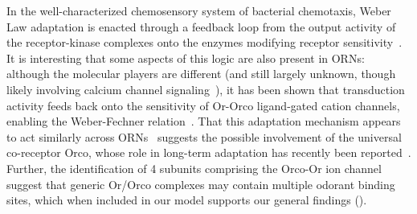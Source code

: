 \documentclass[9pt,lineno]{elife}
\begin{document}
In the well-characterized chemosensory system of bacterial chemotaxis, Weber Law adaptation is enacted through a feedback loop from the output activity of the receptor-kinase complexes onto the enzymes modifying receptor sensitivity~\citep{EmonetReview}. It is interesting that some aspects of this logic are also present in ORNs: although the molecular players are different {\color{blue} (and still largely unknown, though likely involving calcium channel signaling~\citep{cao_WL}), }it has been shown that transduction activity feeds back onto the sensitivity of Or-Orco ligand-gated cation channels, enabling the Weber-Fechner relation~\citep{nagel_wilson_biophysical,srinivas_elife,cao_WL}. 
That this adaptation mechanism appears to act similarly across ORNs~\citep{srinivas_elife,martelli,cao_WL} suggests the possible involvement of the universal co-receptor Orco, whose role in long-term adaptation has recently been reported~\citep{getahun2013insect,getahun2016intracellular,Guo_Smith}. Further, the identification of 4 subunits comprising the Orco-Or ion channel suggest that generic Or/Orco complexes may contain multiple odorant binding sites, which when included in our model supports our general findings ().
\end{document}
